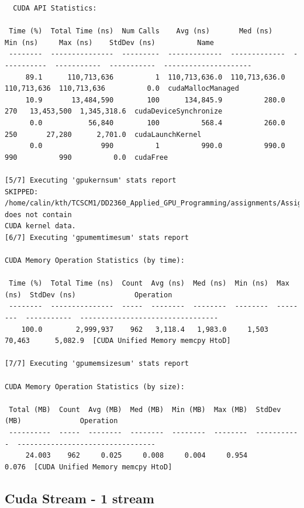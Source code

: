 \documentclass[english]{exam}
\begin{document}
\begin{lstlisting}
  CUDA API Statistics:

 Time (%)  Total Time (ns)  Num Calls    Avg (ns)       Med (ns)      Min (ns)     Max (ns)    StdDev (ns)          Name         
 --------  ---------------  ---------  -------------  -------------  -----------  -----------  -----------  ---------------------
     89.1      110,713,636          1  110,713,636.0  110,713,636.0  110,713,636  110,713,636          0.0  cudaMallocManaged    
     10.9       13,484,590        100      134,845.9          280.0          270   13,453,500  1,345,318.6  cudaDeviceSynchronize
      0.0           56,840        100          568.4          260.0          250       27,280      2,701.0  cudaLaunchKernel     
      0.0              990          1          990.0          990.0          990          990          0.0  cudaFree             

[5/7] Executing 'gpukernsum' stats report
SKIPPED: /home/calin/kth/TCSCM1/DD2360_Applied_GPU_Programming/assignments/Assignment_3/ex_2/my_report.sqlite does not contain
CUDA kernel data.
[6/7] Executing 'gpumemtimesum' stats report

CUDA Memory Operation Statistics (by time):

 Time (%)  Total Time (ns)  Count  Avg (ns)  Med (ns)  Min (ns)  Max (ns)  StdDev (ns)              Operation            
 --------  ---------------  -----  --------  --------  --------  --------  -----------  ---------------------------------
    100.0        2,999,937    962   3,118.4   1,983.0     1,503    70,463      5,082.9  [CUDA Unified Memory memcpy HtoD]

[7/7] Executing 'gpumemsizesum' stats report

CUDA Memory Operation Statistics (by size):

 Total (MB)  Count  Avg (MB)  Med (MB)  Min (MB)  Max (MB)  StdDev (MB)              Operation            
 ----------  -----  --------  --------  --------  --------  -----------  ---------------------------------
     24.003    962     0.025     0.008     0.004     0.954        0.076  [CUDA Unified Memory memcpy HtoD]

\end{lstlisting}

\subsection*{Cuda Stream - 1 stream}
\end{document}
